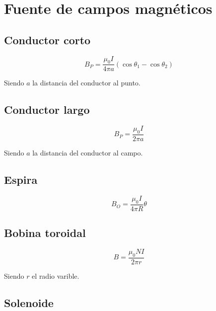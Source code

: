 \documentclass[a4, 12pt]{report}
\begin{document}
  \chapter*{Fuente de campos magnéticos}

    \section*{Conductor corto}

    \begin{equation*}
      B_P=\frac{\mu_0I}{4\pi a}(\cos{\theta_1}-\cos{\theta_2})
    \end{equation*}

    \indent Siendo $a$ la distancia del conductor al punto.

    \section*{Conductor largo}

      \begin{equation*}
        B_P=\frac{\mu_0I}{2\pi a}
      \end{equation*}

      \indent Siendo $a$ la distancia del conductor al campo.

    \section*{Espira}

      \begin{equation*}
        B_O=\frac{\mu_0I}{4\pi R}\theta
      \end{equation*}

    \section*{Bobina toroidal}

      \begin{equation*}
        B=\frac{\mu_0NI}{2\pi r}
      \end{equation*}

      \indent Siendo $r$ el radio varible.

    \section*{Solenoide}
\end{document}
